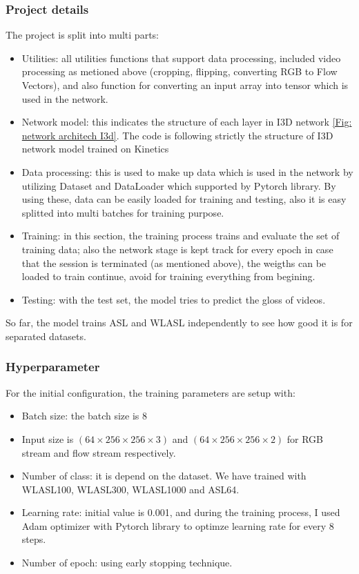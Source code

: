 \documentclass[a4paper, 12pt]{article}
\begin{document}
\subsubsection{Project details}
The project is split into multi parts:

\begin{itemize}
    \item Utilities: all utilities functions that support data processing, included video processing as metioned above (cropping, flipping, converting RGB to Flow Vectors), and also function for converting an input array into tensor which is used in the network.
    \item Network model: this indicates the structure of each layer in I3D network \ref{Fig: network architech I3d}. The code is following strictly the structure of I3D network model trained on Kinetics \citep{szegedy2015going}
    \item Data processing: this is used to make up data which is used in the network by utilizing Dataset and DataLoader which supported by Pytorch library. By using these, data can be easily loaded for training and testing, also it is easy splitted into multi batches for training purpose.
    \item Training: in this section, the training process trains and evaluate the set of training data; also the network stage is kept track for every epoch in case that the session is terminated (as mentioned above), the weigths can be loaded to train continue, avoid for training everything from begining.
    \item Testing: with the test set, the model tries to predict the gloss of videos.
\end{itemize}

So far, the model trains ASL and WLASL independently to see how good it is for separated datasets.

\subsubsection{Hyperparameter}
For the initial configuration, the training parameters are setup with:

\begin{itemize}
    \item Batch size: the batch size is 8
    \item Input size is $(64 \times 256 \times 256 \times 3)$ and $(64 \times 256 \times 256 \times 2)$ for RGB stream and flow stream respectively.
    \item Number of class: it is depend on the dataset. We have trained with WLASL100, WLASL300, WLASL1000 and ASL64.
    \item Learning rate: initial value is 0.001, and during the training process, I used Adam optimizer with Pytorch library to optimze learning rate for every 8 steps.
    \item Number of epoch: using early stopping technique.
\end{itemize}
\end{document}
